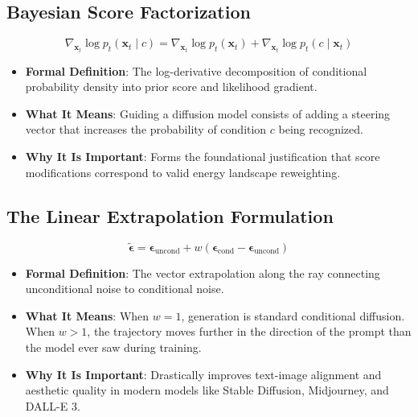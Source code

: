 \documentclass[11pt,a4paper]{article}
\theoremstyle{definition}
\begin{document}
\subsection{Bayesian Score Factorization}
{\boldmath
\begin{equation}
\nabla_{\mathbf{x}_t} \log p_t(\mathbf{x}_t \mid c) = \nabla_{\mathbf{x}_t} \log p_t(\mathbf{x}_t) + \nabla_{\mathbf{x}_t} \log p_t(c \mid \mathbf{x}_t)
\end{equation}
}
\begin{itemize}
    \item \textbf{Formal Definition}: The log-derivative decomposition of conditional probability density into prior score and likelihood gradient.
    \item \textbf{What It Means}: Guiding a diffusion model consists of adding a steering vector that increases the probability of condition $c$ being recognized.
    \item \textbf{Why It Is Important}: Forms the foundational justification that score modifications correspond to valid energy landscape reweighting.
\end{itemize}

\subsection{The Linear Extrapolation Formulation}
{\boldmath
\begin{equation}
\tilde{\boldsymbol{\epsilon}} = \boldsymbol{\epsilon}_{\text{uncond}} + w \left( \boldsymbol{\epsilon}_{\text{cond}} - \boldsymbol{\epsilon}_{\text{uncond}} \right)
\end{equation}
}
\begin{itemize}
    \item \textbf{Formal Definition}: The vector extrapolation along the ray connecting unconditional noise to conditional noise.
    \item \textbf{What It Means}: When $w = 1$, generation is standard conditional diffusion. When $w > 1$, the trajectory moves further in the direction of the prompt than the model ever saw during training.
    \item \textbf{Why It Is Important}: Drastically improves text-image alignment and aesthetic quality in modern models like Stable Diffusion, Midjourney, and DALL-E 3.
\end{itemize}
\end{document}
